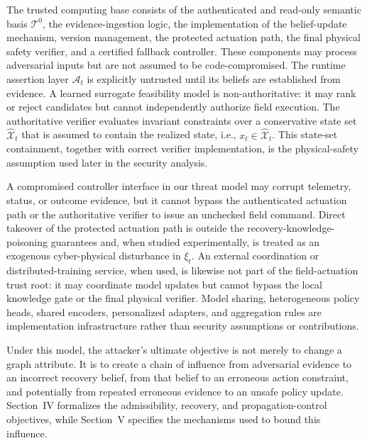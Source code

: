 The trusted computing base consists of the authenticated and read-only semantic basis $\mathcal{T}^{0}$, the evidence-ingestion logic, the implementation of the belief-update mechanism, version management, the protected actuation path, the final physical safety verifier, and a certified fallback controller. These components may process adversarial inputs but are not assumed to be code-compromised. The runtime assertion layer $\mathcal{A}_t$ is explicitly untrusted until its beliefs are established from evidence. A learned surrogate feasibility model is non-authoritative: it may rank or reject candidates but cannot independently authorize field execution. The authoritative verifier evaluates invariant constraints over a conservative state set $\widehat{\mathcal X}_t$ that is assumed to contain the realized state, i.e., $x_t\in\widehat{\mathcal X}_t$. This state-set containment, together with correct verifier implementation, is the physical-safety assumption used later in the security analysis.

A compromised controller interface in our threat model may corrupt telemetry, status, or outcome evidence, but it cannot bypass the authenticated actuation path or the authoritative verifier to issue an unchecked field command. Direct takeover of the protected actuation path is outside the recovery-knowledge-poisoning guarantees and, when studied experimentally, is treated as an exogenous cyber-physical disturbance in $\xi_t$. An external coordination or distributed-training service, when used, is likewise not part of the field-actuation trust root: it may coordinate model updates but cannot bypass the local knowledge gate or the final physical verifier. Model sharing, heterogeneous policy heads, shared encoders, personalized adapters, and aggregation rules are implementation infrastructure rather than security assumptions or contributions.

Under this model, the attacker's ultimate objective is not merely to change a graph attribute. It is to create a chain of influence from adversarial evidence to an incorrect recovery belief, from that belief to an erroneous action constraint, and potentially from repeated erroneous evidence to an unsafe policy update. Section~IV formalizes the admissibility, recovery, and propagation-control objectives, while Section~V specifies the mechanisms used to bound this influence.
